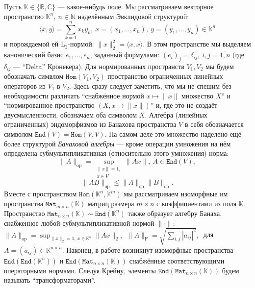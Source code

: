 \documentclass[14pt,a4paper]{extarticle}
\numberwithin{equation}{section}
\theoremstyle{definition}
\begin{document}
Пусть \( \mathbb{K}\in \{ \mathbb{R}, \mathbb{C} \} \)
--- какое-нибудь поле.
Мы рассматриваем векторное пространство \( \mathbb{K}^n,\ n\in \mathbb{N} \)
наделённым Эвклидовой структурой:
    \[
        \langle x, y\rangle{=}\sum_{k=1}^n x_k\overline{y_k},
        \ x{=}(x_1,\ldots, x_n),
        \ y=(y_1,\ldots, y_n)
        \in \mathbb{K}^n
        \]
    и порождаемой ей \( \mathrm{L}_2 \)-нормой:
    \(
        \|x\|_2^2{=}\langle x,x\rangle.
        \)
В этом пространстве мы выделяем канонический базис \( e_1, \ldots, e_n \),
        заданный формулами:
        \( {(e_i)}_j = \delta_{ij},\ i,j=\overline{1,n} \)
    (где \(\delta_{ij} \) --- ``Delta'' Кронекера).
Для нормированных пространств \( V_1, V_2 \) 
    мы будем обозначать симвлом \( \mathtt{Hom}(V_1, V_2) \)
    пространство ограни\-ченных линейных операторов
    из \( V_1 \) в \( V_2 \).
Здесь сразу следует заметить, что мы не спешим без необходимости различать
``снабжённое нормой \(x\mapsto \|x\| \) множество \( X \)''
и ``нормированное пространство \( (X, x\mapsto \|x\|) \)''
и, где это не создаёт двусмысленности, обозначаем оба символом \( X \).
Алгебра (линейных ограниченных) эндоморфизмов
    из Банахова пространства \( V \)
    в себя обозначается символом \( \mathtt{End}(V) = \mathtt{Hom}(V, V) \).
На самом деле это множество наделено ещё более структурой \emph{Банаховой
  алгебры} --- кроме операции умножения на нём определена суб\-мульти\-пликатив\-ная
(относительно этого умножения) норма:
    \[
        \|A\|_{\mathrm{op}} =
        \sup_{
            \substack{\|x\|=1,\\ x\in V}
        } \|A x\|,\ A\in \mathtt{End}(V),
        \]
     \[
       \|AB\|_{\mathrm{op}} \leq \|A\|_{\mathrm{op}} \|B\|_{\mathrm{op}}.
        \]
Вместе с пространством \( \mathtt{Hom}(\mathbb{K}^n, \mathbb{K}^m) \)
    мы рассматриваем изоморфные им пространства \(
    \mathtt{Mat}_{m{\times}n}(\mathbb{K}) \)
    матриц размера \( m{\times}n \)
    с коэффициентами из поля \( \mathbb{K} \).
Пространство \( \mathtt{Mat}_{n{\times}n}(\mathbb{K})\sim
\mathtt{End}(\mathbb{K}^n) \)
также образует алгебру Банаха, снабженное любой суб\-мульти\-пликатив\-ной нормой
    \( \|\cdot\| \):
    \( \|A\|_{\mathrm{op}} = \sup_{\|x\|_2=1,\ x\in \mathbb{K}^n} \|A x\|_2,\ \)
    \( \|A\|_{\mathrm{F}} = \sqrt{\sum_{i,j} |a_{ij}|^2},\ \)
    для 
    \( A{=}(a_{ij})\in\mathbb{K}^{n\times n} \).
Наконец, в работе возникнут изоморфные пространства
    \( \mathtt{End}(\mathtt{End}(\mathbb{K}^n)) \) и \(
    \mathtt{End}(\mathtt{Mat}_{n{\times}n}(\mathbb{K})) \)
    снабжённые соответствующими операторными нормами.
Следуя Крейну, элементы \( \mathtt{End}(\mathtt{Mat}_{n{\times}n}(\mathbb{K})) \)
    будем называть ``транс\-форм\-аторами''.
\end{document}
